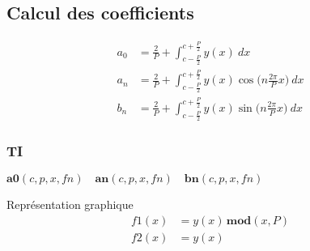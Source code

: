 \subsection{Calcul des coefficients}
\vspace{-.75\baselineskip}
\begin{align*}
    a_0 &= \frac{2}{P}+\int_{c-\frac{P}{2}}^{c+\frac{P}{2}} y(x) \:dx \\
    a_n &= \frac{2}{P}+\int_{c-\frac{P}{2}}^{c+\frac{P}{2}} y(x)\cos\bigg(n\frac{2\pi}{P}x\bigg) \:dx \\
    b_n &= \frac{2}{P}+\int_{c-\frac{P}{2}}^{c+\frac{P}{2}} y(x)\sin\bigg(n\frac{2\pi}{P}x\bigg) \:dx
\end{align*}
\subsubsection{TI}
\centering
\(
    \mathbf{a0}(c,p,x,fn)\hspace{1em}    \mathbf{an}(c,p,x,fn)\hspace{1em}    \mathbf{bn}(c,p,x,fn) 
\)\\
\raggedright
Représentation graphique
\begin{align*}
    f1(x) &= y(x)\,\mathbf{mod}(x,P)\\
    f2(x)&=y(x)
\end{align*}
